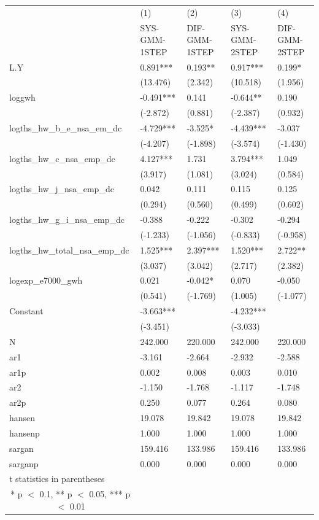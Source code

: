 \documentclass[12pt]{article}
\begin{document}
\begin{tabular}{ p{5.2cm} p{2cm} p{2cm} p{2cm} p{2cm} }
  \hline
   &(1)&(2)&(3)&(4)\\
   &\footnotesize{SYS-GMM-1STEP}&\footnotesize{DIF-GMM-1STEP}&\footnotesize{SYS-GMM-2STEP}&\footnotesize{DIF-GMM-2STEP}\\
 \hline
 L.Y&0.891***&0.193**&0.917***&0.199*\\
  &(13.476)&(2.342)&(10.518)&(1.956)\\
 loggwh&-0.491***&0.141&-0.644**&0.190\\
  &(-2.872)&(0.881)&(-2.387)&(0.932)\\
logths\_hw\_b\_e\_nsa\_em\_dc&-4.729***&-3.525*&-4.439***&-3.037\\
  &(-4.207)&(-1.898)&(-3.574)&(-1.430)\\
logths\_hw\_c\_nsa\_emp\_dc&4.127***&1.731&3.794***&1.049\\
  &(3.917)&(1.081)&(3.024)&(0.584)\\
logths\_hw\_j\_nsa\_emp\_dc&0.042&0.111&0.115&0.125\\
  &(0.294)&(0.560)&(0.499)&(0.602)\\
logths\_hw\_g\_i\_nsa\_emp\_dc&-0.388&-0.222&-0.302&-0.294\\
  &(-1.233)&(-1.056)&(-0.833)&(-0.958)\\
logths\_hw\_total\_nsa\_emp\_dc&1.525***&2.397***&1.520***&2.722**\\
  &(3.037)&(3.042)&(2.717)&(2.382)\\
logexp\_e7000\_gwh&0.021&-0.042*&0.070&-0.050\\
  &(0.541)&(-1.769)&(1.005)&(-1.077)\\
 Constant&-3.663***& &-4.232***& \\
 &(-3.451)& &(-3.033)& \\
 \hline
N&242.000&220.000&242.000&220.000\\
ar1&-3.161&-2.664&-2.932&-2.588\\
ar1p&0.002&0.008&0.003&0.010\\
ar2&-1.150&-1.768&-1.117&-1.748\\
ar2p&0.250&0.077&0.264&0.080\\
hansen&19.078&19.842&19.078&19.842\\
hansenp&1.000&1.000&1.000&1.000\\
sargan&159.416&133.986&159.416&133.986\\
sarganp&0.000&0.000&0.000&0.000\\
 \hline
 t statistics in parentheses\\
\multicolumn{1}{c}{* p $<$ 0.1, ** p $<$ 0.05, *** p $<$ 0.01} \\

\end{tabular}
\end{document}
